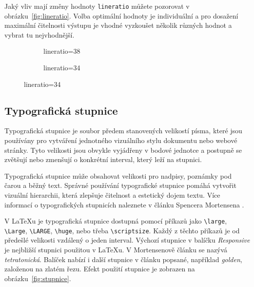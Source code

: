 \documentclass{csbulletin}
\newcommand\balicek[1]{\textit{#1}}
\begin{document}
Jaký vliv mají změny hodnoty \texttt{lineratio} můžete pozorovat v obrázku~\ref{fig:lineratio}. 
Volba optimální hodnoty je individuální a pro dosažení maximální čitelnosti
výstupu je vhodné vyzkoušet několik různých hodnot a vybrat tu nejvhodnější.




\begin{figure}[tbp]
  \caption{Změna řádkového prokladu změnou hodnoty \texttt{lineratio}}
  \label{fig:lineratio}
  \begin{subfigure}[b]{0.45\textwidth}
\caption{lineratio=38}
\end{subfigure}
\begin{subfigure}[b]{0.45\textwidth}
\caption{lineratio=34}
\end{subfigure}
\end{figure}

\subsection{Typografická stupnice}

Typografická stupnice je soubor předem stanovených velikostí písma, které jsou
používány pro vytváření jednotného vizuálního stylu dokumentu nebo webové
stránky. Tyto velikosti jsou obvykle vyjádřeny v bodové jednotce a postupně se
zvětšují nebo zmenšují o konkrétní interval, který leží na stupnici.

Typografická stupnice může obsahovat velikosti pro nadpisy, poznámky pod čarou a běžný
text. Správné používání typografické stupnice pomáhá vytvořit vizuální
hierarchii, která zlepšuje čitelnost a estetický dojem textu. 
Více informací o typografických stupnicích naleznete v článku Spencera Mortensena
\cite{mortensen}. 

V \LaTeX u je typografická stupnice dostupná pomocí příkazů jako \verb|\large|, \verb|\Large|, \verb|\LARGE|,
\verb|\huge|, nebo třeba \verb|\scriptsize|. Každý z těchto příkazů je od předešlé velikosti 
vzdálený o jeden interval.  Výchozí stupnice v balíčku \balicek{Responsive} je nejbližší stupnici použitou v \LaTeX u.
V Mortensenově článku se nazývá \textit{tetratonická}. Balíček nabízí i další stupnice v článku popsané,
například \textit{golden}, založenou na zlatém řezu. Efekt použití stupnice je zobrazen na 
obrázku~\ref{fig:stupnice}.
\end{document}
